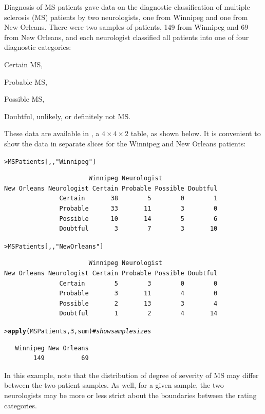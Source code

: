 \documentclass[10pt,krantz2]{krantz}\usepackage[]{graphicx}\usepackage[]{color}
\makeatletter
\newcommand{\hlnum}[1]{\textcolor[rgb]{0.686,0.059,0.569}{#1}}%
\newcommand{\hlstr}[1]{\textcolor[rgb]{0.192,0.494,0.8}{#1}}%
\newcommand{\hlcom}[1]{\textcolor[rgb]{0.678,0.584,0.686}{\textit{#1}}}%
\newcommand{\hlstd}[1]{\textcolor[rgb]{0.345,0.345,0.345}{#1}}%
\newcommand{\hlkwd}[1]{\textcolor[rgb]{0.737,0.353,0.396}{\textbf{#1}}}%
\newenvironment{kframe}{%
 \def\at@end@of@kframe{}%
 \ifinner\ifhmode%
  \def\at@end@of@kframe{\end{minipage}}%
  \begin{minipage}{\columnwidth}%
 \fi\fi%
 \def\FrameCommand##1{\hskip\@totalleftmargin \hskip-\fboxsep
 \colorbox{shadecolor}{##1}\hskip-\fboxsep
     \hskip-\linewidth \hskip-\@totalleftmargin \hskip\columnwidth}%
 \MakeFramed {\advance\hsize-\width
   \@totalleftmargin\z@ \linewidth\hsize
   \@setminipage}}%
 {\par\unskip\endMakeFramed%
 \at@end@of@kframe}
\newenvironment{knitrout}{}{} %
\renewenvironment{knitrout}{\small\renewcommand{\baselinestretch}{.85}}{} %
\makeatother
\begin{document}
\begin{Example}[MS1]{Diagnosis of MS patients}
\citet{LandisKoch:77} gave data on the diagnostic classification
of multiple sclerosis (MS) patients by two neurologists,
one from Winnipeg and one from New Orleans.
There were two samples of patients, 149 from Winnipeg and
69 from New Orleans, and each neurologist classified
all patients
into one of four diagnostic categories:
\begin{seriate}
\item Certain MS,
\item Probable MS,
\item Possible MS,
\item Doubtful, unlikely, or definitely not MS.
\end{seriate}

These data are available in ,
a $4 \times 4 \times 2$ table, as shown below.
It is convenient to show the data in separate slices for the Winnipeg
and New Orleans patients:
\begin{knitrout}
\color{fgcolor}\begin{kframe}
\begin{alltt}
\hlstd{> }\hlstd{MSPatients[, ,} \hlstr{"Winnipeg"}\hlstd{]}
\end{alltt}
\begin{verbatim}
                       Winnipeg Neurologist
New Orleans Neurologist Certain Probable Possible Doubtful
               Certain       38        5        0        1
               Probable      33       11        3        0
               Possible      10       14        5        6
               Doubtful       3        7        3       10
\end{verbatim}
\begin{alltt}
\hlstd{> }\hlstd{MSPatients[, ,} \hlstr{"New Orleans"}\hlstd{]}
\end{alltt}
\begin{verbatim}
                       Winnipeg Neurologist
New Orleans Neurologist Certain Probable Possible Doubtful
               Certain        5        3        0        0
               Probable       3       11        4        0
               Possible       2       13        3        4
               Doubtful       1        2        4       14
\end{verbatim}
\begin{alltt}
\hlstd{> }\hlkwd{apply}\hlstd{(MSPatients,} \hlnum{3}\hlstd{, sum)}      \hlcom{# show sample sizes}
\end{alltt}
\begin{verbatim}
   Winnipeg New Orleans 
        149          69 
\end{verbatim}
\end{kframe}
\end{knitrout}
In this example, note that the distribution of degree of severity of
MS may differ between the two patient samples.  As well, for a
given sample, the two neurologists may be more or less strict about
the boundaries between the rating categories.


\end{Example}
\end{document}
